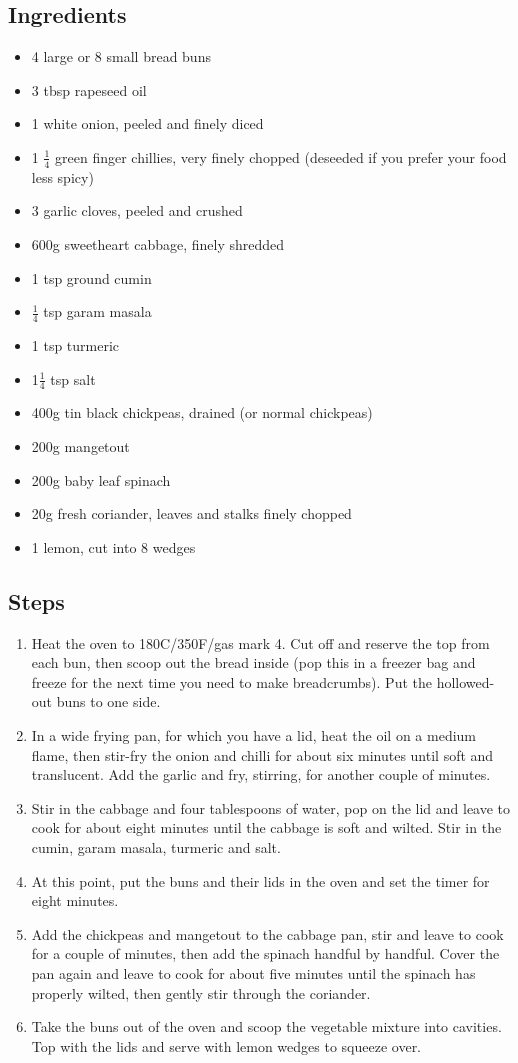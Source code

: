\documentclass{book}
\begin{document}
\subsection*{Ingredients}
\begin{itemize}
\item 4 large or 8 small bread buns
\item 3 tbsp rapeseed oil 
\item 1 white onion, peeled and finely diced
\item 1 $\frac{1}{4}$ green finger chillies, very finely chopped (deseeded if you prefer your food less spicy)
\item 3 garlic cloves, peeled and crushed 
\item 600g sweetheart cabbage, finely shredded
\item 1 tsp ground cumin 
\item $\frac{1}{4}$ tsp garam masala
\item 1 tsp turmeric 
\item 1$\frac{1}{4}$ tsp salt 
\item 400g tin black chickpeas, drained (or normal chickpeas)
\item 200g mangetout 
\item 200g baby leaf spinach
\item 20g fresh coriander, leaves and stalks finely chopped 
\item 1 lemon, cut into 8 wedges 
\end{itemize}

\subsection*{Steps}
\begin{enumerate}
\item Heat the oven to 180C/350F/gas mark 4. Cut off and reserve the top from each bun, then scoop out the bread inside (pop this in a freezer bag and freeze for the next time you need to make breadcrumbs). Put the hollowed-out buns to one side.
\item In a wide frying pan, for which you have a lid, heat the oil on a medium flame, then stir-fry the onion and chilli for about six minutes until soft and translucent. Add the garlic and fry, stirring, for another couple of minutes.
\item Stir in the cabbage and four tablespoons of water, pop on the lid and leave to cook for about eight minutes until the cabbage is soft and wilted. Stir in the cumin, garam masala, turmeric and salt.
\item At this point, put the buns and their lids in the oven and set the timer for eight minutes.
\item Add the chickpeas and mangetout to the cabbage pan, stir and leave to cook for a couple of minutes, then add the spinach handful by handful. Cover the pan again and leave to cook for about five minutes until the spinach has properly wilted, then gently stir through the coriander.
\item Take the buns out of the oven and scoop the vegetable mixture into cavities. Top with the lids and serve with lemon wedges to squeeze over.
\end{enumerate}
\newpage
\end{document}
